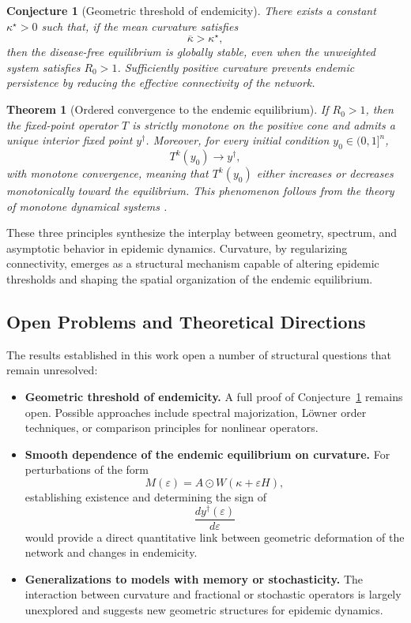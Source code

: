 \documentclass[final,3p,times,twocolumn]{elsarticle}
\newtheorem{theorem}{Theorem}
\newtheorem{conjecture}{Conjecture}
\begin{document}
\begin{conjecture}[Geometric threshold of endemicity]
\label{conj:geothreshold_revised}
There exists a constant $\kappa^\star>0$ such that, if the mean curvature
satisfies
\[
    \overline{\kappa} > \kappa^\star,
\]
then the disease-free equilibrium is globally stable, even when the unweighted
system satisfies $R_0>1$. Sufficiently positive curvature prevents endemic
persistence by reducing the effective connectivity of the network.
\end{conjecture}

\begin{theorem}[Ordered convergence to the endemic equilibrium]
\label{thm:ordercontraction_final}
If $R_0>1$, then the fixed-point operator $T$ is strictly monotone on the
positive cone and admits a unique interior fixed point $y^\dagger$. Moreover,
for every initial condition $y_0\in (0,1]^n$,
\[
    T^k(y_0) \longrightarrow y^\dagger,
\]
with monotone convergence, meaning that $T^k(y_0)$ either increases or
decreases monotonically toward the equilibrium. This phenomenon follows from
the theory of monotone dynamical systems
\cite{Hirsch1985,Smith1995}.
\end{theorem}

These three principles synthesize the interplay between geometry, spectrum, and
asymptotic behavior in epidemic dynamics. Curvature, by regularizing
connectivity, emerges as a structural mechanism capable of altering epidemic
thresholds and shaping the spatial organization of the endemic equilibrium.


\subsection{Open Problems and Theoretical Directions}

The results established in this work open a number of structural questions that
remain unresolved:

\begin{itemize}[label=--]
    \item[(i)] \textbf{Geometric threshold of endemicity.}  
    A full proof of Conjecture~\ref{conj:geothreshold_revised} remains open.
    Possible approaches include spectral majorization, Löwner order techniques,
    or comparison principles for nonlinear operators.

    \item[(ii)] \textbf{Smooth dependence of the endemic equilibrium on curvature.}  
    For perturbations of the form
    \[
        M(\varepsilon)=A\odot W(\kappa+\varepsilon H),
    \]
    establishing existence and determining the sign of
    \[
        \frac{d y^\dagger(\varepsilon)}{d\varepsilon}
    \]
    would provide a direct quantitative link between geometric deformation of
    the network and changes in endemicity.

    \item[(iii)] \textbf{Generalizations to models with memory or stochasticity.}  
    The interaction between curvature and fractional or stochastic operators is
    largely unexplored and suggests new geometric structures for epidemic
    dynamics.
\end{itemize}
\end{document}
